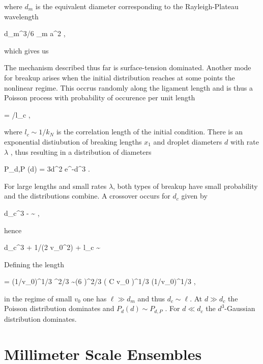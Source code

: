 where $d_m$ is the equivalent diameter corresponding to the Rayleigh-Plateau wavelength

\be
  \pi  d_m^3/6 \simeq  \pi \lambda_m a^2 , 
\nd

which gives us 

\be
    
\nd

The mechanism described thus far is surface-tension dominated. 
Another mode for breakup arises when the initial distribution reaches 
at some points the nonlinear regime. This occrus randomly along
the ligament length and is thus a Poisson process with probability of 
occurence per unit length

\be
\lambda = \exp[{-1/(2 v_0^2)}]/l_c \label{p3} , 
\nd

where $l_c \sim 1/k_N$ is the correlation length of the initial condition. There is an exponential distiubution
of breaking lengths $x_1$ and droplet diameters $d$ with rate $\lambda$ , thus resulting in a distribution of diameters

\be
  P_{d,P} (d) = {3d^2} \lambda e^{-\lambda d^3} \label{PP} .
\nd

For large lengths and small rates $\lambda$, both types of breakup have small probability and the distributions
  combine. A crossover occurs for $d_c$ given by

\be
  {\lambda d_c^3} - \ln \lambda  \sim {} , 
\nd

hence

\be
  {\lambda d_c^3} + 1/(2 v_0^2) + \ln l_c \sim {} 
\nd 

Defining the length

\be
  \ell = (1/v_0)^{1/3} \sigma^{2/3} \sim   (6  \pi)^{2/3} \left(  {C \ln v_0} \right)^{1/3}  (1/v_0)^{1/3} , 
\nd

in the regime of small $v_0$ one has $\ell \gg d_m$ and thus $d_c \sim \ell$. At $d \gg d_c$ the Poisson distribution
dominates and $P_d(d) \sim P_{d,P}$ . 
For $d \ll d_c$ the $d^3$-Gaussian distribution dominates. 


\section{Millimeter Scale Ensembles}

